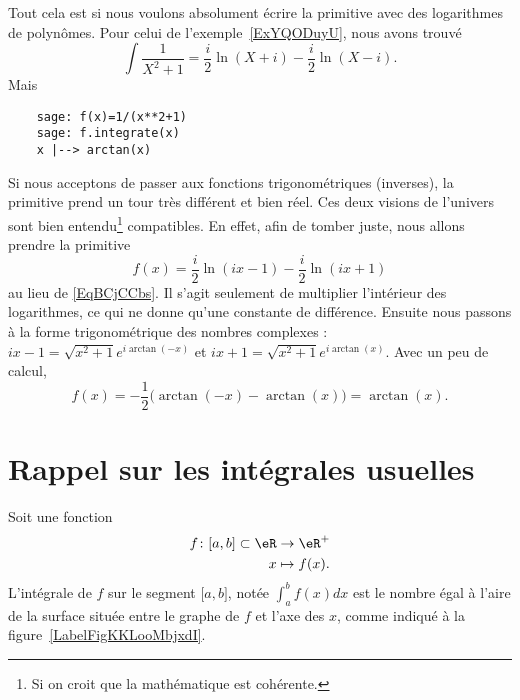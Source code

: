 \begin{remark}
	Tout cela est si nous voulons absolument écrire la primitive avec des logarithmes de polynômes. Pour celui de l'exemple~\ref{ExYQODuyU}, nous avons trouvé
	\begin{equation}    \label{EqBCjCCbs}
		\int\frac{1}{ X^2+1 }=\frac{ i }{2}\ln(X+i)-\frac{ i }{2}\ln(X-i).
	\end{equation}
	Mais
	\begin{verbatim}
    sage: f(x)=1/(x**2+1)
    sage: f.integrate(x)
    x |--> arctan(x)
    \end{verbatim}
	Si nous acceptons de passer aux fonctions trigonométriques (inverses), la primitive prend un tour très différent et bien réel. Ces deux visions de l'univers sont bien entendu\footnote{Si on croit que la mathématique est cohérente.} compatibles. En effet, afin de tomber juste, nous allons prendre la primitive
	\begin{equation}
		f(x)=\frac{ i }{2}\ln(ix-1)-\frac{ i }{2}\ln(ix+1)
	\end{equation}
	au lieu de \eqref{EqBCjCCbs}. Il s'agit seulement de multiplier l'intérieur des logarithmes, ce qui ne donne qu'une constante de différence. Ensuite nous passons à la forme trigonométrique des nombres complexes : \( ix-1=\sqrt{x^2+1} e^{i\arctan(-x)}\) et \( ix+1=\sqrt{x^2+1} e^{i\arctan(x)}\). Avec un peu de calcul,
	\begin{equation}
		f(x)=-\frac{ 1 }{2}\Big( \arctan(-x)-\arctan(x) \Big)=\arctan(x).
	\end{equation}
\end{remark}


\section{Rappel sur les intégrales usuelles}

Soit une fonction
\begin{equation}
	\begin{aligned}
		f\colon \mathopen[ a , b \mathclose]\subset\eR & \to \eR^+      \\
		x                                              & \mapsto f(x) .
	\end{aligned}
\end{equation}
L'intégrale de $f$ sur le segment $\mathopen[ a , b \mathclose]$, notée $\int_a^bf(x)dx$ est le nombre égal à l'aire de la surface située entre le graphe de $f$ et l'axe des $x$, comme indiqué à la figure~\ref{LabelFigKKLooMbjxdI}. %
\newcommand{\CaptionFigKKLooMbjxdI}{L'intégrale de $f$ entre $a$ et $b$ représente la surface sous la fonction.}


